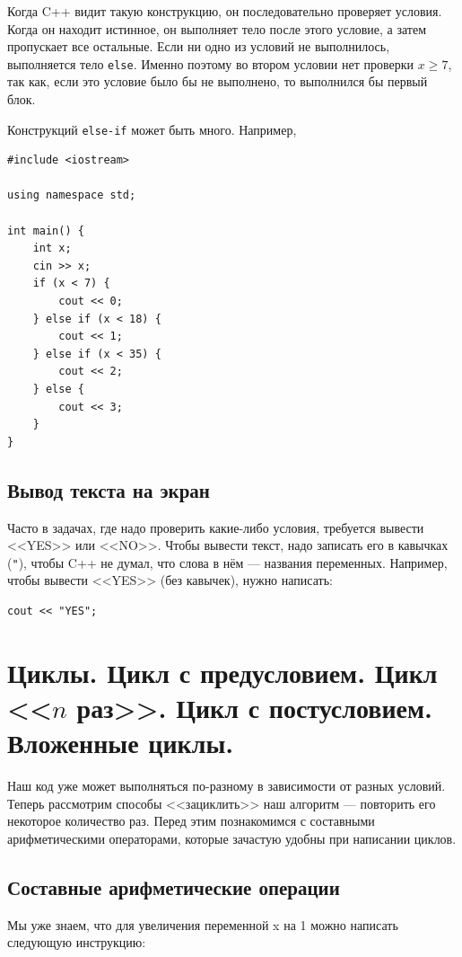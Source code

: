 \documentclass{article}
\begin{document}
	Когда C++ видит такую конструкцию, он последовательно проверяет условия. Когда он находит истинное, он выполняет тело после этого условие, а затем пропускает все остальные. Если ни одно из условий не выполнилось, выполняется тело \texttt{else}. Именно поэтому во втором условии нет проверки $x\ge 7$, так как, если это условие было бы не выполнено, то выполнился бы первый блок.
	
	Конструкций \texttt{else-if} может быть много. Например,
	
	\begin{lstlisting}
#include <iostream>

using namespace std;

int main() {
	int x;
	cin >> x;
	if (x < 7) {
		cout << 0;
	} else if (x < 18) {
		cout << 1;
	} else if (x < 35) {
		cout << 2;
	} else {
		cout << 3;
	}
}
	\end{lstlisting}
	
	\subsection{Вывод текста на экран}
	
	Часто в задачах, где надо проверить какие-либо условия, требуется вывести <<YES>> или <<NO>>. Чтобы вывести текст, надо записать его в кавычках (\texttt{"}), чтобы C++ не думал, что слова в нём --- названия переменных. Например, чтобы вывести <<YES>> (без кавычек), нужно написать:
	
	\begin{lstlisting}
cout << "YES";
	\end{lstlisting}
	
	\section{Циклы. Цикл с предусловием. Цикл <<$n$ раз>>. Цикл с постусловием. Вложенные циклы.}
	
	Наш код уже может выполняться по-разному в зависимости от разных условий. Теперь рассмотрим способы <<зациклить>> наш алгоритм --- повторить его некоторое количество раз. Перед этим познакомимся с составными арифметическими операторами, которые зачастую удобны при написании циклов.
	
	\subsection{Составные арифметические операции}
	
	Мы уже знаем, что для увеличения переменной x на 1 можно написать следующую инструкцию:
	
\end{document}

